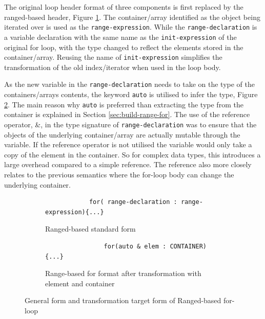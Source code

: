 \documentclass[bsc,frontabs,singlespacing,twoside,parskip,deptreport]{infthesis}
\begin{document}
The original loop header format of three components is first replaced by the ranged-based header, Figure \ref{fig:range-for-header-form}. The container/array identified as the object being iterated over is used as the \texttt{range-expression}. While the \texttt{range-declaration} is a variable declaration with the same name as the \texttt{init-expression} of the original for loop, with the type changed to reflect the elements stored in the container/array. Reusing the name of \texttt{init-expression} simplifies the transformation of the old index/iterator when used in the loop body.
 
As the new variable in the \texttt{range-declaration} needs to take on the type of the containers/arrays contents, the keyword \texttt{auto} is utilised to infer the type, Figure \ref{fig:range-for-header}. The main reason why \texttt{auto} is preferred than extracting the type from the container is explained in Section \ref{sec:build-range-for}. The use of the reference operator, \&, in the type signature of \texttt{range-declaration} was to ensure that the objects of the underlying container/array are actually mutable through the variable. If the reference operator is not utilised the variable would only take a copy of the element in the container. So for complex data types, this introduces a large overhead compared to a simple reference. The reference also more closely relates to the previous semantics where the for-loop body can change the underlying container.
 
\begin{figure}[h]
    \centering
  
  \begin{subfigure}[h]{\textwidth}
        \centering
        \begin{verbatim}
            for( range-declaration : range-expression){...}
        \end{verbatim}
        \caption{Ranged-based standard form}
        \label{fig:range-for-header-form}
        \vspace{0.40cm}
    \end{subfigure}

    \begin{subfigure}[h]{\textwidth}
    \begin{verbatim}
                for(auto & elem : CONTAINER){...}
    \end{verbatim}
    \caption{Range-based for format after transformation with element and container}
    \centering
    \label{fig:range-for-header}
    \end{subfigure}

    \caption{General form and transformation target form of Ranged-based for-loop}
    \label{fig:code-for-headers}
\end{figure}
\end{document}
